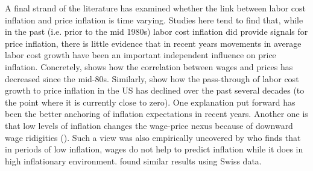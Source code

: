 \documentclass[11pt]{article}
\begin{document}
A final strand of the literature has examined whether the link between labor cost inflation and price inflation is time varying. Studies here tend to find that, while in the past (i.e. prior to the mid 1980s) labor cost inflation did provide signals for price inflation, there is little evidence that in recent years movements in average labor cost growth have been an important independent influence on price inflation. Concretely, \cite{Knotek_Zaman_2014} shows how the correlation between wages and prices has decreased since the mid-80s. Similarly, \cite{Peneva_Rudd_2017} show how the pass-through of labor cost growth to price inflation in the US has declined over the past several decades (to the point where it is currently close to zero). One explanation put forward has been the better anchoring of inflation expectations in recent years. Another one is that low levels of inflation changes the wage-price nexus because of downward wage ridigities (\cite{Daly_Hobijn_2014}). Such a view was also empirically uncovered by \cite{Mehra_2000} who finds that in periods of low inflation, wages do not help to predict inflation while it does in high inflationary environment. \cite{Zanetti2007} found similar results using Swiss data.
\end{document}
